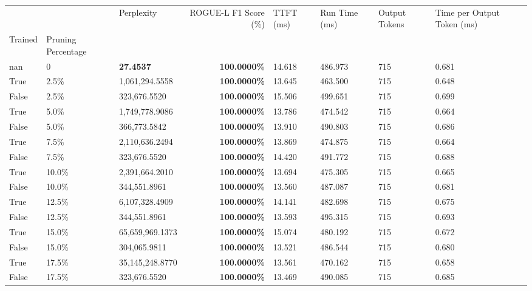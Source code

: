 \begin{table}[H]
\label{tab:evaluation-pipeline-2}
\begin{tabular}{lllrllll}
\toprule
 &  & Perplexity & ROGUE-L F1 Score (\%) & TTFT (ms) & Run Time (ms) & Output Tokens & Time per Output Token (ms) \\
Trained & Pruning Percentage &  &  &  &  &  &  \\
\midrule
nan & 0 & \bfseries 27.4537 & \bfseries 100.0000\% & 14.618 & 486.973 & 715 & 0.681 \\
\cline{1-8}
True & 2.5\% & 1,061,294.5558 & \bfseries \color{red} 100.0000\% & 13.645 & 463.500 & 715 & 0.648 \\
\cline{1-8}
False & 2.5\% & 323,676.5520 & \bfseries \color{red} 100.0000\% & 15.506 & 499.651 & 715 & 0.699 \\
\cline{1-8}
True & 5.0\% & 1,749,778.9086 & \bfseries \color{red} 100.0000\% & 13.786 & 474.542 & 715 & 0.664 \\
\cline{1-8}
False & 5.0\% & 366,773.5842 & \bfseries \color{red} 100.0000\% & 13.910 & 490.803 & 715 & 0.686 \\
\cline{1-8}
True & 7.5\% & 2,110,636.2494 & \bfseries \color{red} 100.0000\% & 13.869 & 474.875 & 715 & 0.664 \\
\cline{1-8}
False & 7.5\% & 323,676.5520 & \bfseries \color{red} 100.0000\% & 14.420 & 491.772 & 715 & 0.688 \\
\cline{1-8}
True & 10.0\% & 2,391,664.2010 & \bfseries \color{red} 100.0000\% & 13.694 & 475.305 & 715 & 0.665 \\
\cline{1-8}
False & 10.0\% & 344,551.8961 & \bfseries \color{red} 100.0000\% & 13.560 & 487.087 & 715 & 0.681 \\
\cline{1-8}
True & 12.5\% & 6,107,328.4909 & \bfseries \color{red} 100.0000\% & 14.141 & 482.698 & 715 & 0.675 \\
\cline{1-8}
False & 12.5\% & 344,551.8961 & \bfseries \color{red} 100.0000\% & 13.593 & 495.315 & 715 & 0.693 \\
\cline{1-8}
True & 15.0\% & 65,659,969.1373 & \bfseries \color{red} 100.0000\% & 15.074 & 480.192 & 715 & 0.672 \\
\cline{1-8}
False & 15.0\% & \color{red} 304,065.9811 & \bfseries \color{red} 100.0000\% & 13.521 & 486.544 & 715 & 0.680 \\
\cline{1-8}
True & 17.5\% & 35,145,248.8770 & \bfseries \color{red} 100.0000\% & 13.561 & 470.162 & 715 & 0.658 \\
\cline{1-8}
False & 17.5\% & 323,676.5520 & \bfseries \color{red} 100.0000\% & 13.469 & 490.085 & 715 & 0.685 \\

\end{tabular}
\end{table}
